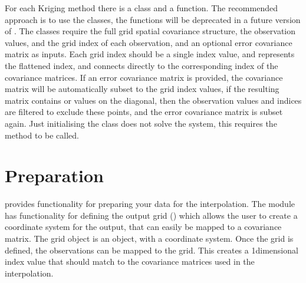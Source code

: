 \documentclass[letterpaper,10pt,english]{sphinxmanual}
\begin{document}
\sphinxAtStartPar
For each Kriging method there is a class and a function. The recommended approach is to use the
classes, the functions will be deprecated in a future version of . The classes
require the full grid spatial covariance structure, the observation values, and the grid index of
each observation, and an optional error covariance matrix as inputs. Each grid index should be a
single index value, and represents the flattened index, and connects directly to the corresponding
index of the covariance matrices. If an error covariance matrix is provided, the covariance matrix
will be automatically subset to the grid index values, if the resulting matrix contains  or 
values on the diagonal, then the observation values and indices are filtered to exclude these
points, and the error covariance matrix is subset again. Just initialising the class does not solve
the system, this requires the  method to be called.


\section{Preparation}
\label{\detokenize{kriging:preparation}}
\sphinxAtStartPar
{} provides functionality for preparing your data for the interpolation. The 
module has functionality for defining the output grid
({\hyperref[\detokenize{covariance:glomar_gridding.grid.grid_from_resolution}]{}}) which allows the user to create a coordinate
system for the output, that can easily be mapped to a covariance matrix. The grid object is an
 object, with a coordinate system. Once the grid is defined, the observations can
be mapped to the grid. This creates a 1\sphinxhyphen{}dimensional index value that should match to the covariance
matrices used in the interpolation.
\end{document}
